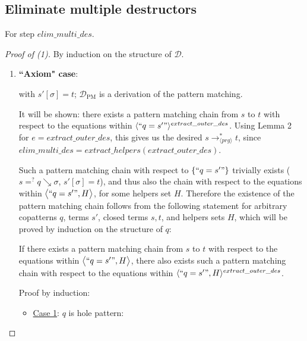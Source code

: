 \documentclass[11pt]{article} %
\begin{document}
\subsection{Eliminate multiple destructors}

For step $elim\_multi\_des$.

\begin{proof}[Proof of (1)] By induction on the structure of $\mathcal{D}$.

\begin{enumerate}
\item \textbf{``Axiom" case}:

\begin{prooftree}
\end{prooftree}

with $s'[\sigma] = t$; $\mathcal{D}_{\textrm{PM}}$ is a derivation of the pattern matching.

It will be shown: there exists a pattern matching chain from $s$ to $t$ with respect to the equations within $\langle `` q = s' " \rangle^{extract\_outer\_des}$. Using Lemma 2 for $e = extract\_outer\_des$, this gives us the desired $s \longrightarrow_{\langle prg \rangle}^* t$, since $elim\_multi\_des = extract\_helpers(extract\_outer\_des)$.

Such a pattern matching chain with respect to $\{ `` q = s' " \}$ trivially exists ($s =^? q \searrow \sigma$, $s'[\sigma] = t$), and thus also the chain with respect to the equations within $\big\langle `` q = s' ", H \big\rangle$, for some helpers set $H$. Therefore the existence of the pattern matching chain follows from the following statement for arbitrary copatterns $q$, terms $s'$, closed terms $s,t$, and helpers sets $H$, which will be proved by induction on the structure of $q$:

If there exists a pattern matching chain from $s$ to $t$ with respect to the equations within $\big\langle `` q = s' ", H \big\rangle$, there also exists such a pattern matching chain with respect to the equations within $\langle `` q = s' ", H \rangle^{extract\_outer\_des}$.

Proof by induction:

\begin{itemize}

\item \underline{Case 1}: $q$ is hole pattern:


\end{itemize}
\end{enumerate}
\end{proof}
\end{document}

